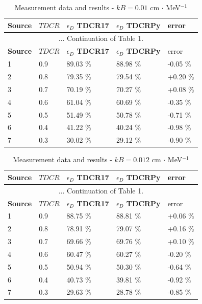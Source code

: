 \documentclass[12pt]{iopart}
\begin{document}
\begingroup
\footnotesize
\begin{longtable}[l]{| p{} | p{} | p{} |p{} |p{} |} 
\caption{Measurement data and results - $kB = 0.01$ cm $\cdot$ MeV$^{-1}$}
\label{Table1} \\ 
\hline
\textbf{Source} & \textbf{$TDCR$} & \textbf{$\epsilon_{D}$ TDCR17} & \textbf{$\epsilon_{D}$ TDCRPy} & error \\ 
\endfirsthead
\multicolumn{5}{c}{... Continuation of Table 1.}\\ 
\hline
 \textbf{Source} & \textbf{$TDCR$} & \textbf{$\epsilon_{D}$ TDCR17} & \textbf{$\epsilon_{D}$ TDCRPy} & error \\   \hline 
\endhead
\hline
 1 &  0.9  &  89.03 \% &   88.98 \% & -0.05 \% \\
 2 &  0.8  &  79.35 \% &   79.54 \% & +0.20 \% \\
 3 &  0.7  &  70.19 \% &   70.27 \% & +0.08 \% \\
 4 &  0.6  &  61.04 \% &   60.69 \% & -0.35 \% \\
 5 &  0.5  &  51.49 \% &   50.78 \% & -0.71 \% \\
 6 &  0.4  &  41.22 \% &   40.24 \% & -0.98 \% \\
 7 &  0.3  &  30.02 \% &   29.12 \% & -0.90 \% \\
\hline
\end{longtable} 
\endgroup

\begingroup
\footnotesize
\begin{longtable}[l]{| p{} | p{} |p{} |p{} |p{} |} 
\caption{Measurement data and results - $kB = 0.012$ cm $\cdot$ MeV$^{-1}$}
\label{Table1} \\ 
\hline
\textbf{Source} & \textbf{$TDCR$} & \textbf{$\epsilon_{D}$ TDCR17} & \textbf{$\epsilon_{D}$ TDCRPy} & error \\ 
\endfirsthead
\multicolumn{5}{c}{... Continuation of Table 1.}\\ 
\hline
 \textbf{Source} & \textbf{$TDCR$} & \textbf{$\epsilon_{D}$ TDCR17} & \textbf{$\epsilon_{D}$ TDCRPy} & error \\   \hline 
\endhead
\hline
 1 & 0.9   &   88.75 \% &   88.81 \% & +0.06 \% \\
 2 & 0.8   &   78.91 \% &   79.07 \% & +0.16 \% \\
 3 & 0.7   &   69.66 \% &   69.76 \% & +0.10 \% \\
 4 & 0.6   &   60.47 \% &   60.27 \% & -0.20 \% \\
 5 & 0.5   &   50.94 \% &   50.30 \% & -0.64 \% \\
 6 & 0.4   &   40.73 \% &   39.81 \% & -0.92 \% \\
 7 & 0.3   &   29.63 \% &   28.78 \% & -0.85 \% \\
\hline
\end{longtable} 
\endgroup
\end{document}
